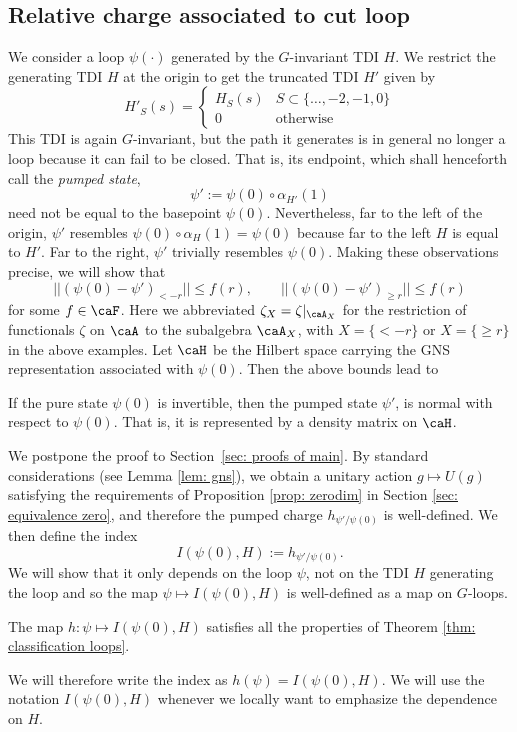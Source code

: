 \subsection{Relative charge associated to cut loop}\label{sec: relative charge for cut loop}


We consider a loop $\psi(\cdot)$ generated by the $G$-invariant TDI $H$. 
We restrict the generating TDI $H$ at the origin to get the truncated TDI $H'$ given by
\begin{equation}\label{eq: tdi cut loop}
	H'_{S}(s)= \begin{cases}   H_S(s)  &  S \subset \{\ldots,-2, -1,0\} \\  0 & \text{otherwise} \end{cases}  
\end{equation}
This TDI is again $G$-invariant, but the path it generates is in general no longer a loop because it can fail to be closed. That is, its endpoint, which shall henceforth call the \emph{pumped state},
$$
\psi':=  \psi(0) \circ \alpha_{H'}(1) 
$$
need not be equal to the basepoint $\psi(0)$.  Nevertheless, far to the left of the origin,  $\psi'$ resembles $\psi(0) \circ \alpha_{H}(1)=\psi(0)$ because far to the left $H$ is equal to $H'$. Far to the right,  $\psi'$ trivially resembles $\psi(0)$. Making these observations precise, we will show that
\begin{equation}\label{eq: same away from cut}
	||(\psi(0)-\psi')_{< -r} || \leq f(r),\qquad  ||(\psi(0)-\psi')_{{\geq r}} || \leq f(r)
\end{equation}
for some $f\in \caF$. Here we abbreviated $\zeta_X=\zeta|_{\caA_X}$ for the restriction of functionals $\zeta$ on $\caA$ to the subalgebra $\caA_X$, with $X=\{{< -r}\}$ or $X=\{{\geq r}\}$ in the above examples. Let $\caH$ be the Hilbert space carrying the GNS representation associated with $\psi(0)$. Then the above bounds lead to
\begin{proposition}\label{prop: equivalence of states}
	If the pure state $\psi(0)$ is invertible, then the pumped state $\psi'$, is normal with respect to $\psi(0)$. That is, it is represented by a density matrix on $\caH$.
\end{proposition}
\noindent We postpone the proof to Section~\ref{sec: proofs of main}. 
By standard considerations (see Lemma \ref{lem: gns}), we obtain a unitary action $g\mapsto U(g)$ satisfying the requirements of Proposition \ref{prop: zerodim} in Section \ref{sec: equivalence zero},  and therefore  the pumped charge $h_{\psi'/{\psi(0)}}$ is well-defined. We then define the index
$$
I(\psi(0),H):=h_{\psi'/{\psi(0)}}.
$$
We will show that it only depends on the loop $\psi$, not on the TDI $H$ generating the loop and so the map $\psi \mapsto I(\psi(0),H) $ is well-defined as a map on $G$-loops.
\begin{theorem}\label{thm: pump index}
	The map $h : \psi \mapsto I(\psi(0),H) $ satisfies all the properties of Theorem \ref{thm: classification loops}.
\end{theorem}
We will therefore write the index as $h(\psi)=I(\psi(0),H)$. We will use the notation $I(\psi(0), H)$ whenever we locally want to emphasize the dependence on $H$.






